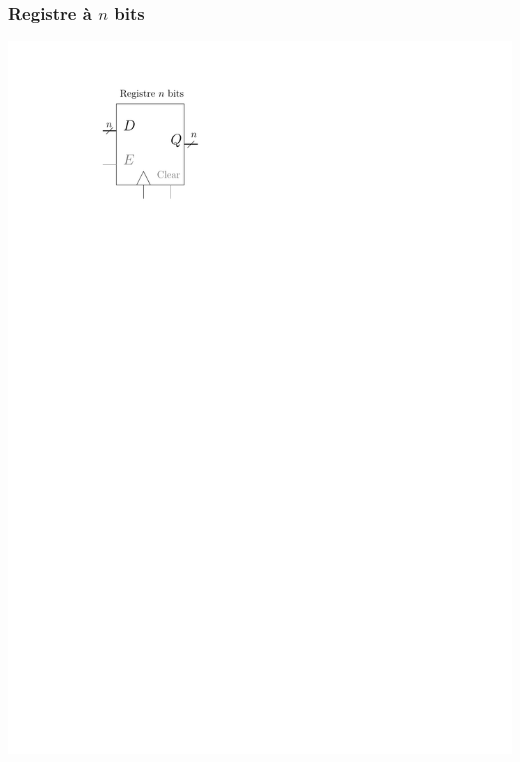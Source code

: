 \documentclass{beamer}
\begin{document}
\begin{frame}
\frametitle{Registre à $n$ bits}

   \begin{minipage}[c]{.2\linewidth}
\includegraphics[width=\columnwidth]{Figs/registre.pdf}
\end{minipage}\hfill
\begin{minipage}[c]{.4\linewidth}

\end{minipage}
\end{frame}
\end{document}

